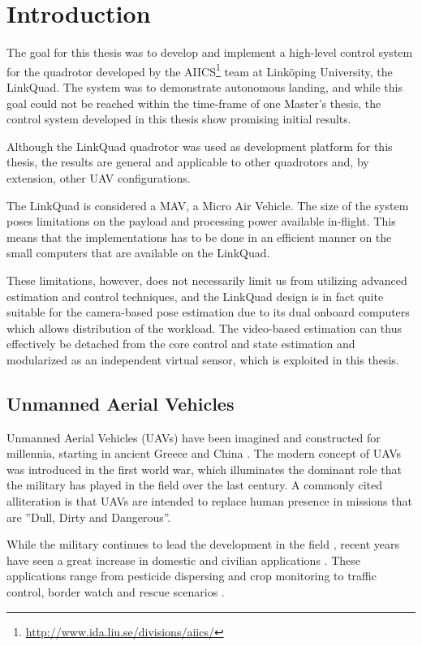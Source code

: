 \chapter{Introduction}
\label{cha:introduction}
    The goal for this thesis was to develop and implement a high-level control system
    for the quadrotor developed by the AIICS\footnote{\url{http://www.ida.liu.se/divisions/aiics/}} team at Linköping University, the LinkQuad.
    The system was to demonstrate autonomous landing, and while this goal
    could not be reached within the time-frame of one Master's thesis, the control
    system developed in this thesis show promising initial results.

    Although the LinkQuad quadrotor was used as development platform for this thesis,
    the results are general and applicable to other quadrotors and, by extension, other UAV configurations.

    The LinkQuad is considered a MAV, a Micro Air Vehicle. %
    The size of the system poses limitations on the payload and processing power
    available in-flight. This means that the implementations has to be done
    in an efficient manner on the small computers that are available on the LinkQuad.

    These limitations, however, does not necessarily limit us from utilizing advanced estimation
    and control techniques, and the LinkQuad design is in fact
    quite suitable for the camera-based pose estimation due to its dual
    onboard computers which allows distribution of the workload.
    The video-based estimation can thus effectively be detached from the
    core control and state estimation and modularized as an independent
    virtual sensor, which is exploited in this thesis.

\section{Unmanned Aerial Vehicles}
    Unmanned Aerial Vehicles (UAVs) have been imagined and constructed for millennia, starting in ancient Greece and China \citep{valavanis2007advances}.
    The modern concept of UAVs was introduced in the first world war, which
    illuminates the dominant role that the military has played in the field over the
    last century. A commonly cited alliteration is that UAVs are intended to replace
    human presence in missions that are ''Dull, Dirty and Dangerous''.

    While the military continues to lead the development in the field \citep{united2010u}, recent years
    have seen a great increase in domestic and civilian applications \citep{Wong_Bil_2006}.
    These applications range from pesticide dispersing and crop monitoring to
    traffic control, border watch and rescue scenarios \citep{Doherty_Rudol_2007}.

